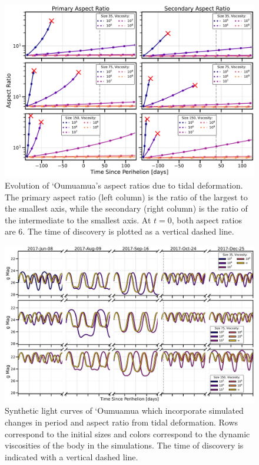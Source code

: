 \documentclass[twocolumn,doublespacing]{aastex631}
\begin{document}
\begin{figure}
\centering
\includegraphics[width=\linewidth,angle=0]{optimal_axis_aspect_ratio.pdf}
\caption{Evolution of `Oumuamua's aspect ratios due to tidal deformation. The primary aspect ratio (left column) is the ratio of the largest to the smallest axis, while the secondary (right column) is the ratio of the intermediate to the smallest axis. At $t=0$, both aspect ratios are 6. The time of discovery is plotted as a vertical dashed line.}
\label{fig:optimalaxisaspectratio}
\end{figure}

\begin{figure}
\centering
\includegraphics[width=\linewidth,angle=0]{optimal_axis_lightcurve_sims.pdf}
\caption{Synthetic light curves of `Oumuamua which incorporate simulated changes in period and aspect ratio from tidal deformation. Rows correspond to the initial sizes and colors correspond to the dynamic viscosities of the body in the simulations. The time of discovery is indicated with a vertical dashed line.}
\label{fig:optimalaxislightcurvesims}
\end{figure}
\end{document}
